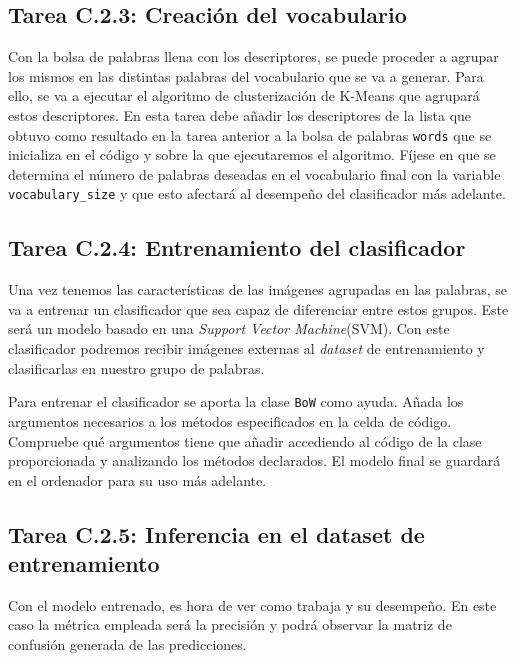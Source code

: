 \subsection*{Tarea C.2.3: Creación del vocabulario}

Con la bolsa de palabras llena con los descriptores, se puede proceder a agrupar los mismos en las distintas palabras del vocabulario que se va a generar. Para ello, se va a ejecutar el algoritmo de clusterización de K-Means que agrupará estos descriptores. En esta tarea debe añadir los descriptores de la lista que obtuvo como resultado en la tarea anterior a la bolsa de palabras \texttt{words} que se inicializa en el código y sobre la que ejecutaremos el algoritmo. Fíjese en que se determina el número de palabras deseadas en el vocabulario final con la variable \texttt{vocabulary\_size} y que esto afectará al desempeño del clasificador más adelante.

\subsection*{Tarea C.2.4: Entrenamiento del clasificador}

Una vez tenemos las características de las imágenes agrupadas en las palabras, se va a entrenar un clasificador que sea capaz de diferenciar entre estos grupos. Este será un modelo basado en una  \textit{Support Vector Machine}(SVM). Con este clasificador podremos recibir imágenes externas al \textit{dataset} de entrenamiento y clasificarlas en nuestro grupo de palabras.

Para entrenar el clasificador se aporta la clase \texttt{BoW} como ayuda. Añada los argumentos necesarios a los métodos especificados en la celda de código. Compruebe qué argumentos tiene que añadir accediendo al código de la clase proporcionada y analizando los métodos declarados. El modelo final se guardará en el ordenador para su uso más adelante.

\subsection*{Tarea C.2.5: Inferencia en el dataset de entrenamiento}

Con el modelo entrenado, es hora de ver como trabaja y su desempeño. En este caso la métrica empleada será la precisión y podrá observar la matriz de confusión generada de las predicciones.

